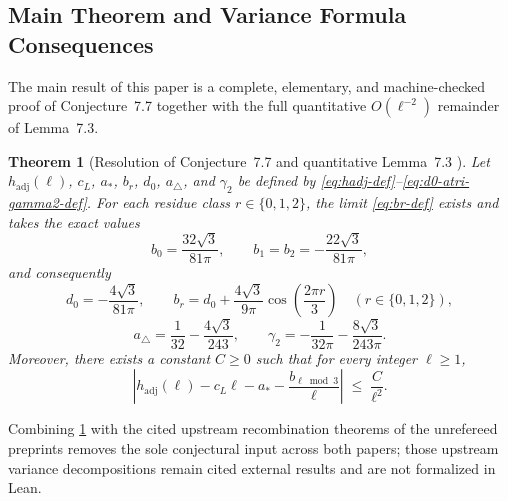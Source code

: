 \documentclass[11pt,a4paper]{article}
\numberwithin{equation}{section}
\theoremstyle{plain}
\newtheorem{theorem}{Theorem}[section]
\theoremstyle{definition}
\theoremstyle{remark}
\newcommand{\hadj}{h_{\mathrm{adj}}}
\newcommand{\tri}{a_{\triangle}}
\begin{document}
\subsection{Main Theorem and Variance Formula Consequences}

The main result of this paper is a complete, elementary, and machine-checked proof of Conjecture~7.7 together with the full quantitative $O(\ell^{-2})$ remainder of Lemma~7.3.

\begin{theorem}[Resolution of Conjecture~7.7 and quantitative Lemma~7.3 \cite{banic_elezovic_p2}]
\label{thm:main}
Let $\hadj(\ell)$, $c_L$, $a_*$, $b_r$, $d_0$, $\tri$, and $\gamma_2$ be defined by \eqref{eq:hadj-def}--\eqref{eq:d0-atri-gamma2-def}. For each residue class $r\in\{0,1,2\}$, the limit \eqref{eq:br-def} exists and takes the exact values
\begin{equation}\label{eq:main-br}
  b_0 = \frac{32\sqrt{3}}{81\pi}, \qquad
  b_1 = b_2 = -\frac{22\sqrt{3}}{81\pi},
\end{equation}
and consequently
\begin{equation}\label{eq:main-d0-cos}
  d_0 = -\frac{4\sqrt{3}}{81\pi}, \qquad
  b_r = d_0 + \frac{4\sqrt{3}}{9\pi}\cos\!\left(\frac{2\pi r}{3}\right)
  \quad (r\in\{0,1,2\}),
\end{equation}
\begin{equation}\label{eq:main-atri-gamma2}
  \tri = \frac{1}{32} - \frac{4\sqrt{3}}{243}, \qquad
  \gamma_2 = -\frac{1}{32\pi} - \frac{8\sqrt{3}}{243\pi}.
\end{equation}
Moreover, there exists a constant $C\ge 0$ such that for every integer $\ell\ge 1$,
\begin{equation}\label{eq:lemma73-rem}
  \left|\hadj(\ell) - c_L\ell - a_* - \frac{b_{\ell\bmod 3}}{\ell}\right|
  \;\le\; \frac{C}{\ell^2}.
\end{equation}
\end{theorem}

Combining \cref{thm:main} with the cited upstream recombination theorems of the unrefereed preprints \cite{banic_elezovic_p2,banic_elezovic_p5} removes the sole conjectural input across both papers; those upstream variance decompositions remain cited external results and are not formalized in Lean.
\end{document}
